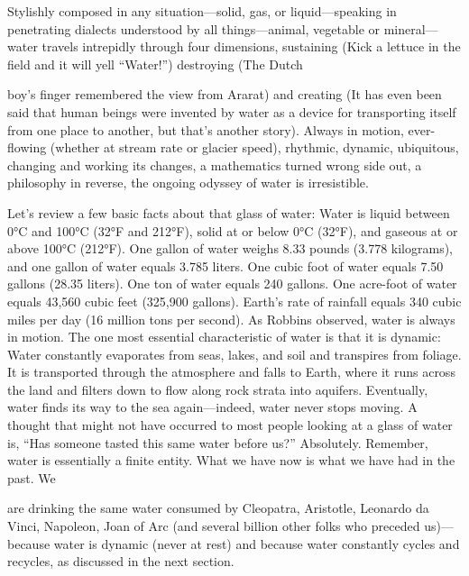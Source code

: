 \documentclass{article}
\begin{document}
Stylishly composed in any situation---solid, gas, or liquid---speaking
in penetrating dialects understood by all things---animal, vegetable or
mineral---water travels intrepidly through four dimensions, sustaining
(Kick a lettuce in the field and it will yell ``Water!'') destroying
(The Dutch

boy's finger remembered the view from Ararat) and creating (It has even
been said that human beings were invented by water as a device for
transporting itself from one place to another, but that's another
story). Always in motion, ever-flowing (whether at stream rate or
glacier speed), rhythmic, dynamic, ubiquitous, changing and working its
changes, a mathematics turned wrong side out, a philosophy in reverse,
the ongoing odyssey of water is irresistible.

Let's review a few basic facts about that glass of water: Water is
liquid between 0°C and 100°C (32°F and 212°F), solid at or below 0°C
(32°F), and gaseous at or above 100°C (212°F). One gallon of water
weighs 8.33 pounds (3.778 kilograms), and one gallon of water equals
3.785 liters. One cubic foot of water equals 7.50 gallons (28.35
liters). One ton of water equals 240 gallons. One acre-foot of water
equals 43,560 cubic feet (325,900 gallons). Earth's rate of rainfall
equals 340 cubic miles per day (16 million tons per second). As Robbins
observed, water is always in motion. The one most essential
characteristic of water is that it is dynamic: Water constantly
evaporates from seas, lakes, and soil and transpires from foliage. It is
transported through the atmosphere and falls to Earth, where it runs
across the land and filters down to flow along rock strata into
aquifers. Eventually, water finds its way to the sea again---indeed,
water never stops moving. A thought that might not have occurred to most
people looking at a glass of water is, ``Has someone tasted this same
water before us?'' Absolutely. Remember, water is essentially a finite
entity. What we have now is what we have had in the past. We

are drinking the same water consumed by Cleopatra, Aristotle, Leonardo
da Vinci, Napoleon, Joan of Arc (and several billion other folks who
preceded us)---because water is dynamic (never at rest) and because
water constantly cycles and recycles, as discussed in the next section.
\end{document}
